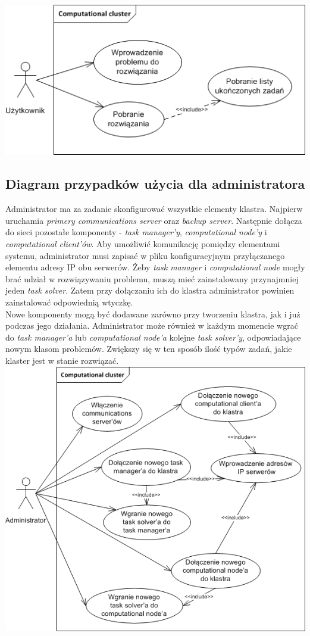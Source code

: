 \documentclass[12pt,a4paper,titlepage]{report}
\begin{document}
\includegraphics[width=\textwidth]{img/usecaseUser.png}	
	
	\subsection{Diagram przypadków użycia dla administratora}
	Administrator ma za zadanie skonfigurować wszystkie elementy klastra. Najpierw uruchamia \emph{primery communications server} oraz \emph{backup server}. Następnie dołącza do sieci pozostałe komponenty - \emph{task manager'y}, \emph{computational node'y} i \emph{computational client'ów}. Aby umożliwić komunikację pomiędzy elementami systemu, administrator musi zapisać w pliku konfiguracyjnym przyłączanego elementu adresy IP obu serwerów. Żeby \emph{task manager} i \emph{computational node} mogły brać udział w rozwiązywaniu problemu, muszą mieć zainstalowany przynajmniej jeden \emph{task solver}. Zatem przy dołączaniu ich do klastra administrator powinien zainstalować odpowiednią wtyczkę.\\
Nowe komponenty mogą być dodawane zarówno przy tworzeniu klastra, jak i już podczas jego działania. Administrator może również w każdym momencie wgrać do \emph{task manager'a} lub \emph{computational node'a} kolejne \emph{task solver'y}, odpowiadające nowym klasom problemów. Zwiększy się w ten sposób ilość typów zadań, jakie klaster jest w stanie rozwiązać.\\

	\includegraphics[width=\textwidth]{img/usecaseAdmin.png}	
	
\end{document}
